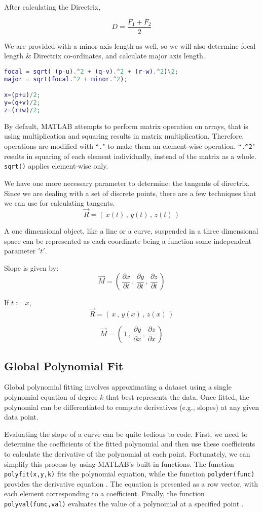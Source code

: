 \documentclass[a4paper]{article}
\begin{document}
After calculating the Directrix,

\[D = \frac{F_{1} + F_{2}}{2}\]

We are provided with a minor axis length as well, so we will also
determine focal length \& Directrix co-ordinates, and calculate major
axis length.

\begin{lstlisting}[language=matlab]
focal = sqrt( (p-u).^2 + (q-v).^2 + (r-w).^2)\2;
major = sqrt(focal.^2 + minor.^2);

x=(p+u)/2;
y=(q+v)/2;
z=(r+w)/2;
\end{lstlisting}
By default, MATLAB attempts to perform matrix operation on arrays, that is using multiplication and squaring results in matrix multiplication. Therefore, operations are modified with ``\verb|.|" to make them an element-wise operation. ``\verb|.^2|" results in squaring of each element individually, instead of the matrix as a whole. \verb|sqrt()| applies element-wise only.

We have one more necessary parameter to determine: the tangents of directrix. Since we are dealing with a set of discrete points, there are a few techniques that we can use for calculating tangents.
\[\Vec{R}  =  \left(\, x(t)\,  ,\,  y(t) \, , \,  z(t)\, \right)\]

A one dimensional object, like a line or a curve, suspended in a three dimensional space can be represented as each coordinate being a function some independent parameter $'t'$.

Slope is given by:\[  \Vec{M}  =  \left(\, \frac{\partial x}{\partial t} \, ,\,  \frac{\partial y}{\partial t}\,  ,\,  \frac{\partial z}{\partial t}\, \right) \]

If \(t := x\),
\[\Vec{R}  =  \left( \,x\,  ,\,  y(x) \, ,\,  z(x) \,\right)\]

\[  \Vec{M}  =  \left( \,1 \, ,\,  \frac{\partial y}{\partial x}  \,,\,  \frac{\partial z}{\partial x}\, \right) \]
\pagebreak
\hypertarget{global-fit}{%
\subsection{Global Polynomial Fit}\label{GlobalFit}}
Global polynomial fitting involves approximating a dataset using a single polynomial equation of degree $k$ that best represents the data. Once fitted, the polynomial can be differentiated to compute derivatives (e.g., slopes) at any given data point.

Evaluating the slope of a curve can be quite tedious to code. First, we need to determine the coefficients of the fitted polynomial and then use these coefficients to calculate the derivative of the polynomial at each point. Fortunately, we can simplify this process by using MATLAB’s built-in functions. The function \verb|polyfit(x,y,k)| fits the polynomial equation, while the function \verb|polyder(func)| provides the derivative equation \cite{mathworks_polyfit}\cite{mathworks_polyder} . The equation is presented as a row vector, with each element corresponding to a coefficient. Finally, the function \verb|polyval(func,val)| evaluates the value of a polynomial at a specified point \cite{mathworks_polyval}.
\end{document}
